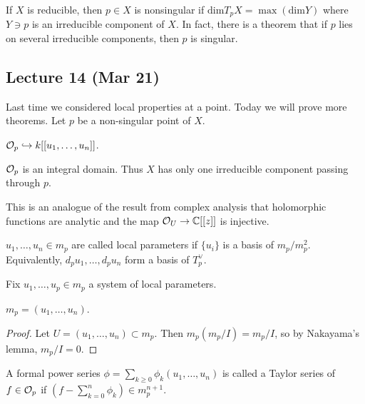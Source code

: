 \documentclass[twoside, 10pt]{article}
\begin{document}
    If $X$ is reducible, then $p \in X$ is nonsingular if $\mathrm{dim}T_p X = \max (\mathrm{dim} Y)$ where $Y \ni p$ is an irreducible component of $X$. In fact, there is a theorem that if $p$ lies on several irreducible components, then $p$ is singular. 

    \subsection{Lecture 14 (Mar 21)}
    
    Last time we considered local properties at a point. Today we will prove more theorems. Let $p$ be a non-singular point of $X$.

    \begin{thm}
        $\mathcal{O}_p \hookrightarrow k[[u_1, \ldots, u_n]]$.
    \end{thm}

    \begin{cor}
        $\mathcal{O}_p$ is an integral domain. Thus $X$ has only one irreducible component passing through $p$.
    \end{cor}

    \begin{rmk}
        This is an analogue of the result from complex analysis that holomorphic functions are analytic and the map $\mathcal{O}_U \to \mathbb{C}[[z]]$ is injective.
    \end{rmk}

    \begin{defn}
        $u_1, \ldots, u_n \in m_p$ are called local parameters if $\{u_i\}$ is a basis of $m_p/m_p^2$. Equivalently, $d_p u_1, \ldots, d_p u_n$ form a basis of $T_p^{\vee}$.
    \end{defn}
    
    Fix $u_1, \ldots, u_p \in m_p$ a system of local parameters. 

    \begin{lem}
        $m_p = (u_1, \ldots, u_n)$.
        \begin{proof}
            Let $U = (u_1, \ldots, u_n) \subset m_p$. Then $m_p (m_p/I) = m_p/I$, so by Nakayama's lemma, $m_p/I = 0$.
        \end{proof}
    \end{lem}

    \begin{defn}
        A formal power series $\phi = \sum_{k \geq 0} \phi_k(u_1, \ldots, u_n)$ is called a Taylor series of $f \in \mathcal{O}_p$ if $\left( f - \sum_{k=0}^n \phi_k \right) \in m_p^{n+1}$.
    \end{defn}
\end{document}
